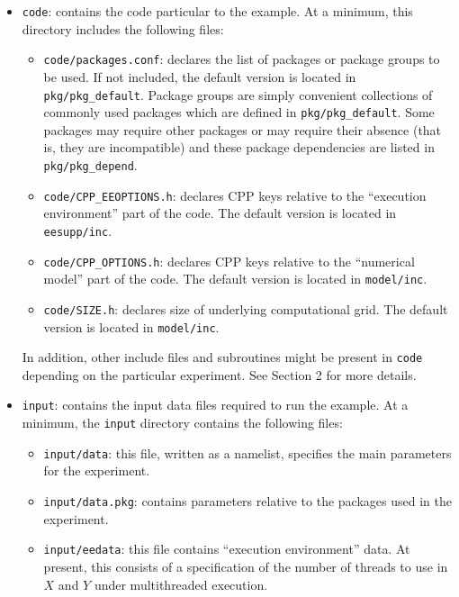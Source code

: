 \begin{itemize}
\item \texttt{code}: contains the code particular to the example. At a
  minimum, this directory includes the following files:

  \begin{itemize}
  \item \texttt{code/packages.conf}: declares the list of packages or
    package groups to be used.  If not included, the default version
    is located in \texttt{pkg/pkg\_default}.  Package groups are
    simply convenient collections of commonly used packages which are
    defined in \texttt{pkg/pkg\_default}.  Some packages may require
    other packages or may require their absence (that is, they are
    incompatible) and these package dependencies are listed in
    \texttt{pkg/pkg\_depend}.

  \item \texttt{code/CPP\_EEOPTIONS.h}: declares CPP keys relative to
    the ``execution environment'' part of the code. The default
    version is located in \texttt{eesupp/inc}.
  
  \item \texttt{code/CPP\_OPTIONS.h}: declares CPP keys relative to
    the ``numerical model'' part of the code. The default version is
    located in \texttt{model/inc}.
  
  \item \texttt{code/SIZE.h}: declares size of underlying
    computational grid.  The default version is located in
    \texttt{model/inc}.
  \end{itemize}
  
  In addition, other include files and subroutines might be present in
  \texttt{code} depending on the particular experiment. See Section 2
  for more details.
  
\item \texttt{input}: contains the input data files required to run
  the example. At a minimum, the \texttt{input} directory contains the
  following files:

  \begin{itemize}
  \item \texttt{input/data}: this file, written as a namelist,
    specifies the main parameters for the experiment.
  
  \item \texttt{input/data.pkg}: contains parameters relative to the
    packages used in the experiment.
  
  \item \texttt{input/eedata}: this file contains ``execution
    environment'' data. At present, this consists of a specification
    of the number of threads to use in $X$ and $Y$ under multithreaded
    execution.
  \end{itemize}
  

\end{itemize}

